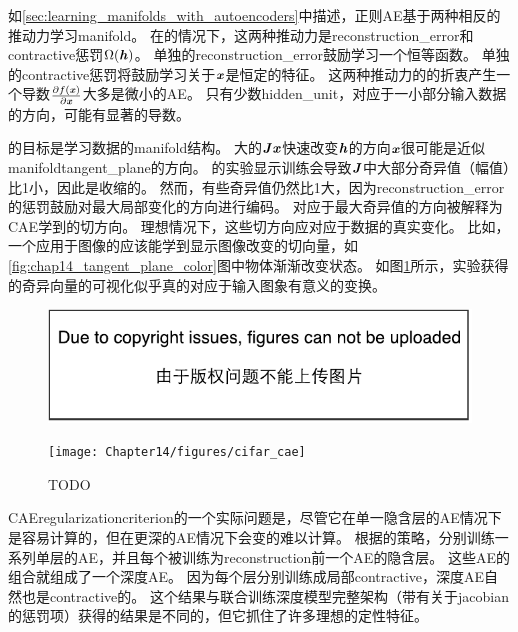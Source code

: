 如\ref{sec:learning_manifolds_with_autoencoders}中描述，正则\gls{AE}基于两种相反的推动力学习\gls{manifold}。
在的情况下，这两种推动力是\gls{reconstruction_error}和\gls{contractive}惩罚$\Omega(\boldsymbol{\mathit{h}})$。
单独的\gls{reconstruction_error}鼓励学习一个恒等函数。
单独的\gls{contractive}惩罚将鼓励学习关于$\boldsymbol{\mathit{x}}$是恒定的特征。
这两种推动力的的折衷产生一个导数$\frac{\partial f(\boldsymbol{\mathit{x}})}{\partial \boldsymbol{\mathit{x}}}$大多是微小的\gls{AE}。
只有少数\gls{hidden_unit}，对应于一小部分输入数据的方向，可能有显著的导数。


的目标是学习数据的\gls{manifold}结构。
大的$\boldsymbol{\mathit{J}}\boldsymbol{\mathit{x}}$快速改变$\boldsymbol{\mathit{h}}$的方向$\boldsymbol{\mathit{x}}$很可能是近似\gls{manifold}\gls{tangent_plane}的方向。
\citet{Rifai+al-2011-small,Salah+al-2011-small}的实验显示训练会导致$\boldsymbol{\mathit{J}}$中大部分奇异值（幅值）比1小，因此是收缩的。
然而，有些奇异值仍然比1大，因为\gls{reconstruction_error}的惩罚鼓励对最大局部变化的方向进行编码。
对应于最大奇异值的方向被解释为\gls{CAE}学到的切方向。
理想情况下，这些切方向应对应于数据的真实变化。
比如，一个应用于图像的应该能学到显示图像改变的切向量，如\ref{fig:chap14_tangent_plane_color}图中物体渐渐改变状态。
如图\ref{fig:chap14_cifar_cae}所示，实验获得的奇异向量的可视化似乎真的对应于输入图象有意义的变换。


\begin{figure}[!htb]
\ifOpenSource
\centerline{\includegraphics{figure.pdf}}
\else
\centerline{\texttt{[image: Chapter14/figures/cifar\_cae]}}
\fi
\caption{TODO}
\label{fig:chap14_cifar_cae}
\end{figure}

\gls{CAE}\gls{regularization}\gls{criterion}的一个实际问题是，尽管它在单一隐含层的\gls{AE}情况下是容易计算的，但在更深的\gls{AE}情况下会变的难以计算。
根据\citet{Rifai+al-2011-small}的策略，分别训练一系列单层的\gls{AE}，并且每个被训练为\gls{reconstruction}前一个\gls{AE}的隐含层。
这些\gls{AE}的组合就组成了一个深度\gls{AE}。
因为每个层分别训练成局部\gls{contractive}，深度\gls{AE}自然也是\gls{contractive}的。
这个结果与联合训练深度模型完整架构（带有关于\gls{jacobian}的惩罚项）获得的结果是不同的，但它抓住了许多理想的定性特征。



